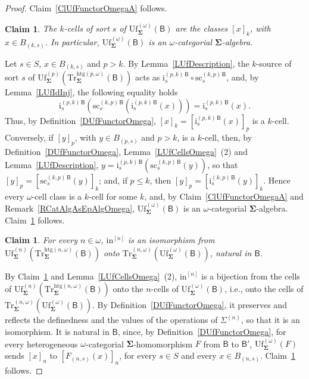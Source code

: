 \documentclass[a4paper, reqno]{amsbook}
\newcommand{\sig}[1]{\mathbf{#1}}             %
\newcommand{\calg}[1]{\boldsymbol{\mathsf{#1}}} %
\newcommand{\htg}{\mathrm{htg}}                %
\newcommand{\src}{\mathrm{sc}}
\newcommand{\Uf}{\mathrm{Uf}}
\newcommand{\Tr}{\mathrm{Tr}}
\theoremstyle{plain}
\newtheorem{claim}[theorem]{Claim}
\theoremstyle{definition}
\begin{document}
\begin{proof}
Claim~\ref{ClUfFunctorOmegaA} follows.

\begin{claim}\label{ClUfFunctorOmegaB}
The $k$-cells of sort $s$ of $\Uf^{(\omega)}_{\sig{\Sigma}}(\calg{B})$ are the classes $[x]_{k}$, with $x\in B_{(k,s)}$.
In particular, $\Uf^{(\omega)}_{\sig{\Sigma}}(\calg{B})$ is an $\omega$-categorial $\sig{\Sigma}$-algebra.
\end{claim}

Let $s\in S$, $x\in B_{(k,s)}$ and $p>k$.
By Lemma~\ref{LUfDescription}, the $k$-source of sort $s$ of $\Uf^{(p)}_{\sig{\Sigma}}(\Tr^{\htg(p,\omega)}_{\sig{\Sigma}}(\calg{B}))$ acts as $\mathrm{i}^{(p,k)\,\calg{B}}_{s}\circ\src^{(k,p)\,\calg{B}}_{s}$, and, by Lemma~\ref{LUfIdInj}, the following equality holds
$$
\mathrm{i}^{(p,k)\,\calg{B}}_{s}\left(\src^{(k,p)\,\calg{B}}_{s}\left(\mathrm{i}^{(p,k)\,\calg{B}}_{s}(x)\right)\right)
=
\mathrm{i}^{(p,k)\,\calg{B}}_{s}(x).
$$
Thus, by Definition~\ref{DUfFunctorOmega}, $[x]_{k}=[\mathrm{i}^{(p,k)\,\calg{B}}_{s}(x)]_{p}$ is a $k$-cell.
Conversely, if $[y]_{p}$, with $y\in B_{(p,s)}$ and $p>k$, is a $k$-cell, then, by Definition~\ref{DUfFunctorOmega}, Lemma~\ref{LUfCellsOmega}~(2) and Lemma~\ref{LUfDescription}, $y=\mathrm{i}^{(p,k)\,\calg{B}}_{s}(\src^{(k,p)\,\calg{B}}_{s}(y))$, so that $[y]_{p}=[\src^{(k,p)\,\calg{B}}_{s}(y)]_{k}$; and, if $p\leq k$, then $[y]_{p}=[\mathrm{i}^{(k,p)\,\calg{B}}_{s}(y)]_{k}$.
Hence every $\omega$-cell class is a $k$-cell for some $k$, and, by Claim~\ref{ClUfFunctorOmegaA} and Remark~\ref{RCatAlgAsEpAlgOmega}, $\Uf^{(\omega)}_{\sig{\Sigma}}(\calg{B})$ is an $\omega$-categorial $\sig{\Sigma}$-algebra.
Claim~\ref{ClUfFunctorOmegaB} follows.

\begin{claim}\label{ClUfFunctorOmegaC}
For every $n\in\omega$, $\mathrm{in}^{[n]}$ is an isomorphism from $\Uf^{(n)}_{\sig{\Sigma}}(\Tr^{\htg(n,\omega)}_{\sig{\Sigma}}(\calg{B}))$ onto $\Tr^{(n,\omega)}_{\sig{\Sigma}}(\Uf^{(\omega)}_{\sig{\Sigma}}(\calg{B}))$, natural in $\calg{B}$.
\end{claim}

By Claim~\ref{ClUfFunctorOmegaB} and Lemma~\ref{LUfCellsOmega}~(2), $\mathrm{in}^{[n]}$ is a bijection from the cells of $\Uf^{(n)}_{\sig{\Sigma}}(\Tr^{\htg(n,\omega)}_{\sig{\Sigma}}(\calg{B}))$ onto the $n$-cells of $\Uf^{(\omega)}_{\sig{\Sigma}}(\calg{B})$, i.e., onto the cells of $\Tr^{(n,\omega)}_{\sig{\Sigma}}(\Uf^{(\omega)}_{\sig{\Sigma}}(\calg{B}))$.
By Definition~\ref{DUfFunctorOmega}, it preserves and reflects the definedness and the values of the operations of $\Sigma^{(n)}$, so that it is an isomorphism.
It is natural in $\calg{B}$, since, by Definition~\ref{DUfFunctorOmega}, for every heterogeneous $\omega$-categorial $\sig{\Sigma}$-homomorphism $F$ from $\calg{B}$ to $\calg{B}'$, $\Uf^{(\omega)}_{\sig{\Sigma}}(F)$ sends $[x]_{n}$ to $[F_{(n,s)}(x)]_{n}$, for every $s\in S$ and every $x\in B_{(n,s)}$.
Claim~\ref{ClUfFunctorOmegaC} follows.


\end{proof}
\end{document}
